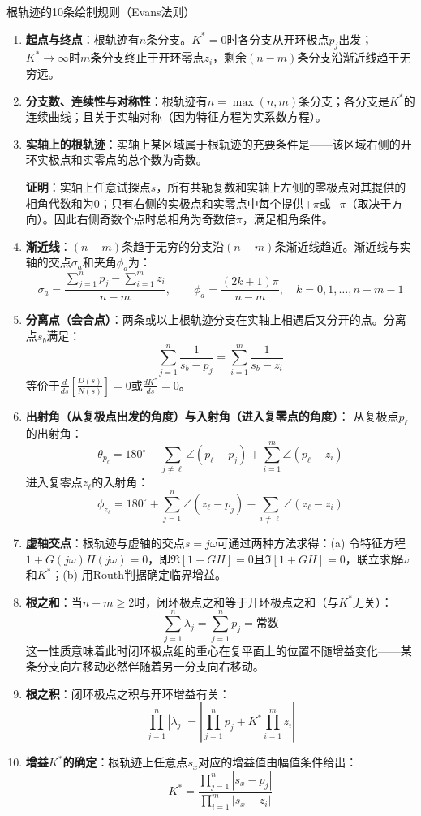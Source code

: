 \begin{myalgorithm}{根轨迹的10条绘制规则（Evans法则）}
\begin{enumerate}
\item \textbf{起点与终点}：根轨迹有$n$条分支。$K^*=0$时各分支从开环极点$p_j$出发；$K^*\to\infty$时$m$条分支终止于开环零点$z_i$，剩余$(n-m)$条分支沿渐近线趋于无穷远。

\item \textbf{分支数、连续性与对称性}：根轨迹有$n = \max(n,m)$条分支；各分支是$K^*$的连续曲线；且关于实轴对称（因为特征方程为实系数方程）。

\item \textbf{实轴上的根轨迹}：实轴上某区域属于根轨迹的充要条件是——该区域右侧的开环实极点和实零点的总个数为奇数。

\textbf{证明}：实轴上任意试探点$s$，所有共轭复数和实轴上左侧的零极点对其提供的相角代数和为0；只有右侧的实极点和实零点中每个提供$+\pi$或$-\pi$（取决于方向）。因此右侧奇数个点时总相角为奇数倍$\pi$，满足相角条件。

\item \textbf{渐近线}：$(n-m)$条趋于无穷的分支沿$(n-m)$条渐近线趋近。渐近线与实轴的交点$\sigma_a$和夹角$\phi_a$为：
\[
\sigma_a = \frac{\sum_{j=1}^{n} p_j - \sum_{i=1}^{m} z_i}{n-m}, \qquad
\phi_a = \frac{(2k+1)\pi}{n-m}, \quad k=0,1,\dots,n-m-1
\]

\item \textbf{分离点（会合点）}：两条或以上根轨迹分支在实轴上相遇后又分开的点。分离点$s_b$满足：
\[
\sum_{j=1}^{n} \frac{1}{s_b - p_j} = \sum_{i=1}^{m} \frac{1}{s_b - z_i}
\]
等价于$\frac{d}{ds}\left[\frac{D(s)}{N(s)}\right] = 0$或$\frac{dK^*}{ds} = 0$。

\item \textbf{出射角（从复极点出发的角度）与入射角（进入复零点的角度）}：
从复极点$p_\ell$的出射角：
\[
\theta_{p_\ell} = 180^\circ - \sum_{j\neq\ell} \angle(p_\ell-p_j) + \sum_{i=1}^{m} \angle(p_\ell-z_i)
\]
进入复零点$z_\ell$的入射角：
\[
\phi_{z_\ell} = 180^\circ + \sum_{j=1}^{n} \angle(z_\ell-p_j) - \sum_{i\neq\ell} \angle(z_\ell-z_i)
\]

\item \textbf{虚轴交点}：根轨迹与虚轴的交点$s = j\omega$可通过两种方法求得：(a) 令特征方程$1+G(j\omega)H(j\omega)=0$，即$\Re[1+GH] = 0$且$\Im[1+GH] = 0$，联立求解$\omega$和$K^*$；(b) 用Routh判据确定临界增益。

\item \textbf{根之和}：当$n-m \geq 2$时，闭环极点之和等于开环极点之和（与$K^*$无关）：
\[
\sum_{j=1}^{n} \lambda_j = \sum_{j=1}^{n} p_j = \text{常数}
\]
这一性质意味着此时闭环极点组的重心在复平面上的位置不随增益变化——某条分支向左移动必然伴随着另一分支向右移动。

\item \textbf{根之积}：闭环极点之积与开环增益有关：
\[
\prod_{j=1}^{n} |\lambda_j| = \left|\prod_{j=1}^{n} p_j + K^* \prod_{i=1}^{m} z_i\right|
\]

\item \textbf{增益$K^*$的确定}：根轨迹上任意点$s_x$对应的增益值由幅值条件给出：
\[
K^* = \frac{\prod_{j=1}^{n} |s_x - p_j|}{\prod_{i=1}^{m} |s_x - z_i|}
\]
\end{enumerate}
\end{myalgorithm}

